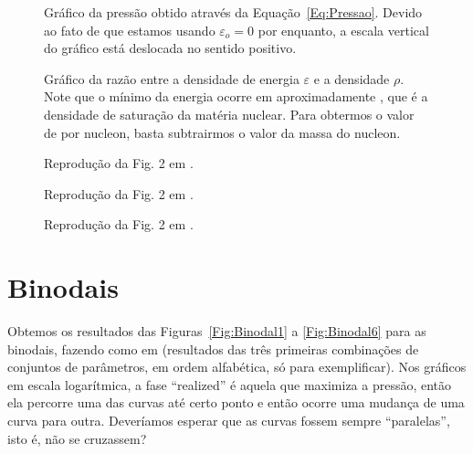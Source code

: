 \begin{figure}
	
	\caption{Gráfico da pressão obtido através da Equação~\eqref{Eq:Pressao}. Devido ao fato de que estamos usando $\varepsilon_o = 0$ por enquanto, a escala vertical do gráfico está deslocada no sentido positivo. \protect}
	\label{Fig:pressure_graph_eNJL1m}
\end{figure}

\begin{figure}
	
	\caption{Gráfico da razão entre a densidade de energia $\varepsilon$ e a densidade $\rho$. Note que o mínimo da energia ocorre em aproximadamente , que é a densidade de saturação da matéria nuclear. Para obtermos o valor de  por nucleon, basta subtrairmos o valor da massa do nucleon. \protect}
	\label{Fig:energy_by_nucleon_graph_eNJL1m}
\end{figure}

\begin{figure}
	
	\caption{Reprodução da Fig. 2 em \textcite{Pais}.}
	\label{Fig:Rep_Pais_Mass}
\end{figure}

\begin{figure}
	
	\caption{Reprodução da Fig. 2 em \textcite{Pais}.}
	\label{Fig:Rep_Pais_Pressure}
\end{figure}

\begin{figure}
	
	\caption{Reprodução da Fig. 2 em \textcite{Pais}.}
	\label{Fig:Rep_Pais_Energy_Dens}
\end{figure}

\FloatBarrier

\section{Binodais}

Obtemos os resultados das Figuras~\ref{Fig:Binodal1} a \ref{Fig:Binodal6} para as binodais, fazendo como em \textcite{japoneses2} (resultados das três primeiras combinações de conjuntos de parâmetros, em ordem alfabética, só para exemplificar). Nos gráficos em escala logarítmica, a fase ``realized'' é aquela que maximiza a pressão, então ela percorre uma das curvas até certo ponto e então ocorre uma mudança de uma curva para outra. Deveríamos esperar que as curvas fossem sempre ``paralelas'', isto é, não se cruzassem?

